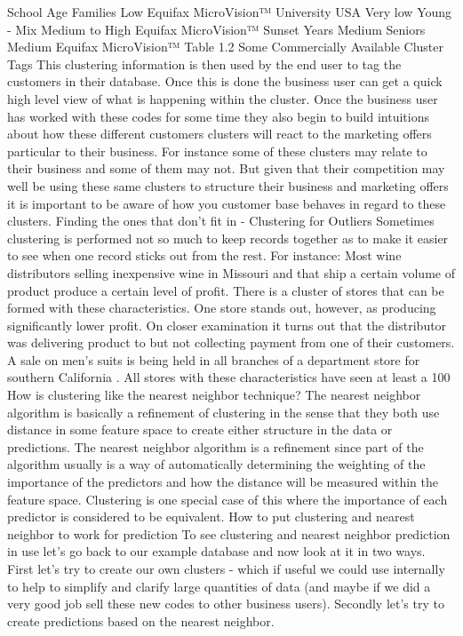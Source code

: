 School Age Families
Low
Equifax MicroVision™
University USA 
Very low
Young - Mix
Medium to High
Equifax MicroVision™
Sunset Years
Medium
Seniors
Medium
Equifax MicroVision™
Table 1.2 Some Commercially Available Cluster Tags
This clustering information is then used by the end user to tag the customers in their database.  Once this is done the business user can get a quick high level view of what is happening within the cluster. Once the business user has worked with these codes for some time they also begin to build intuitions about how these different customers clusters will react to the marketing offers particular to their business.   For instance some of these clusters may relate to their business and some of them may not.  But given that their competition may well be using these same clusters to structure their business and marketing offers it is important to be aware of how you customer base behaves in regard to these clusters.
Finding the ones that don't fit in - Clustering for Outliers
Sometimes clustering is performed not so much to keep records together as to make it easier to see when one record sticks out from the rest.  For instance:
Most wine distributors selling inexpensive wine in Missouri and that ship a certain volume of product produce a certain level of profit.  There is a cluster of stores that can be formed with these characteristics.  One store stands out, however, as producing significantly lower profit.   On closer examination it turns out that the distributor was delivering product to but not collecting payment from one of their customers.
A sale on men’s suits is being held in all branches of a department store for southern California .   All stores with these characteristics  have seen at least a 100%
How is clustering like the nearest neighbor technique?
The nearest neighbor algorithm is basically a refinement of clustering in the sense that they both use distance in some feature space to create either structure in the data or predictions.  The nearest neighbor algorithm is a refinement since part of the algorithm usually is a way of automatically determining the weighting of the importance of the predictors and how the distance will be measured within the feature space.  Clustering is one special case of this where the importance of each predictor is considered to be equivalent.
How to put clustering and nearest neighbor to work for prediction
To see clustering and nearest neighbor prediction in use let’s go back to our example database and now look at it in two ways.  First let’s try to create our own clusters - which if useful we could use internally to help to simplify and clarify large quantities of data (and maybe if we did a very good job sell these new codes to other business users).  Secondly let’s try to create predictions based on the nearest neighbor.
